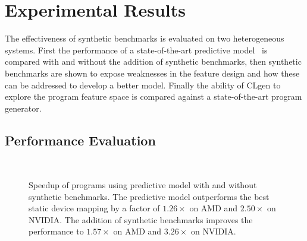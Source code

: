 \section{Experimental Results}
\label{sec:clgen-eval-results}

The effectiveness of synthetic benchmarks is evaluated on two heterogeneous systems. First the performance of a state-of-the-art predictive model~\cite{Grewe2013} is compared with and without the addition of synthetic benchmarks, then synthetic benchmarks are shown to expose weaknesses in the feature design and how these can be addressed to develop a better model. Finally the ability of CLgen to explore the program feature space is compared against a state-of-the-art program generator.

\subsection{Performance Evaluation}

\begin{figure}
  \centering %
  \\%
  \caption[Speedup of predictions with and without synthetic benchmarks]{%
    Speedup of programs using \citeauthor{Grewe2013} predictive model with and without synthetic benchmarks. The predictive model outperforms the best static device mapping by a factor of $1.26\times$ on AMD and $2.50\times$ on NVIDIA. The addition of synthetic benchmarks improves the performance to $1.57\times$ on AMD and $3.26\times$ on NVIDIA.%
  }%
  \label{fig:npb} %
\end{figure}

